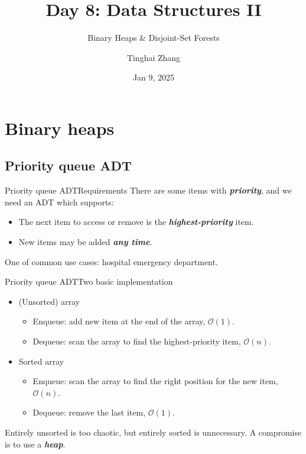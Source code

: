 \documentclass[aspectratio=169]{ctexbeamer}
\title{Day 8: Data Structures II}
\subtitle{Binary Heaps \& Disjoint-Set Forests}
\author{Tinghai Zhang}
\date{Jan 9, 2025}
\newcommand{\highlight}[1]{\textbf{\textit{#1}}}
\begin{document}
    \begin{frame}
        \maketitle
    \end{frame}

    \section{Binary heaps}

    \subsection{Priority queue ADT}

    \begin{frame}{Priority queue ADT}{Requirements}
        There are some items with \highlight{priority}, and we need an ADT which supports:

        \begin{itemize}
            \item The next item to access or remove is the \highlight{highest-priority} item.
            \item New items may be added \highlight{any time}.
        \end{itemize}

        One of common use cases: hospital emergency department.
    \end{frame}

    \begin{frame}{Priority queue ADT}{Two basic implementation}
        \begin{itemize}
            \item (Unsorted) array
            \begin{itemize}
                \item Enqueue: add new item at the end of the array, $\mathcal O(1)$.
                \item Dequeue: scan the array to find the highest-priority item, $\mathcal O(n)$.
            \end{itemize}
            \item Sorted array
            \begin{itemize}
                \item Enqueue: scan the array to find the right position for the new item, $\mathcal O(n)$.
                \item Dequeue: remove the last item, $\mathcal O(1)$.
            \end{itemize}
        \end{itemize}
    
        Entirely unsorted is too chaotic, but entirely sorted is unnecessary. A compromise is to use a \highlight{heap}.
    \end{frame}
\end{document}
